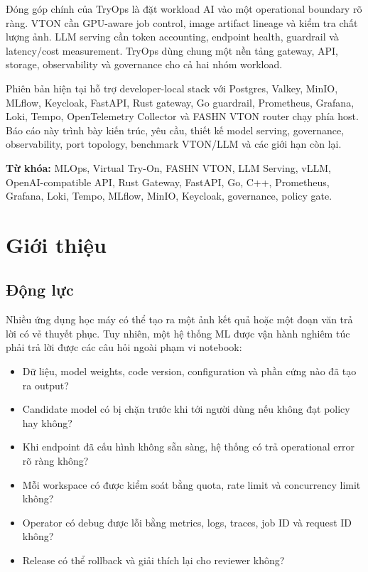 \documentclass[12pt,a4paper,oneside]{report}
\begin{document}
Đóng góp chính của TryOps là đặt workload AI vào một operational boundary rõ ràng. VTON cần GPU-aware job control, image artifact lineage và kiểm tra chất lượng ảnh. LLM serving cần token accounting, endpoint health, guardrail và latency/cost measurement. TryOps dùng chung một nền tảng gateway, API, storage, observability và governance cho cả hai nhóm workload.

Phiên bản hiện tại hỗ trợ developer-local stack với Postgres, Valkey, MinIO, MLflow, Keycloak, FastAPI, Rust gateway, Go guardrail, Prometheus, Grafana, Loki, Tempo, OpenTelemetry Collector và FASHN VTON router chạy phía host. Báo cáo này trình bày kiến trúc, yêu cầu, thiết kế model serving, governance, observability, port topology, benchmark VTON/LLM và các giới hạn còn lại.

\textbf{Từ khóa:} MLOps, Virtual Try-On, FASHN VTON, LLM Serving, vLLM, OpenAI-compatible API, Rust Gateway, FastAPI, Go, C++, Prometheus, Grafana, Loki, Tempo, MLflow, MinIO, Keycloak, governance, policy gate.

\tableofcontents
\listoffigures
\clearpage
{}

\chapter{Giới thiệu}

\section{Động lực}

Nhiều ứng dụng học máy có thể tạo ra một ảnh kết quả hoặc một đoạn văn trả lời có vẻ thuyết phục. Tuy nhiên, một hệ thống ML được vận hành nghiêm túc phải trả lời được các câu hỏi ngoài phạm vi notebook:

\begin{itemize}
  \item Dữ liệu, model weights, code version, configuration và phần cứng nào đã tạo ra output?
  \item Candidate model có bị chặn trước khi tới người dùng nếu không đạt policy hay không?
  \item Khi endpoint đã cấu hình không sẵn sàng, hệ thống có trả operational error rõ ràng không?
  \item Mỗi workspace có được kiểm soát bằng quota, rate limit và concurrency limit không?
  \item Operator có debug được lỗi bằng metrics, logs, traces, job ID và request ID không?
  \item Release có thể rollback và giải thích lại cho reviewer không?
\end{itemize}
\end{document}
